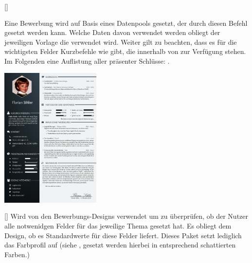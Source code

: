[]
\def\txewidth{0cm}
\begin{example}
    \gdef\txewidth{5.5cm}
\end{example}
\begin{minipage}{\linewidth-\txewidth}
    Eine Bewerbung wird auf Basis eines Datenpools gesetzt, der durch diesen Befehl gesetzt werden kann. Welche Daten davon verwendet werden obliegt der jeweiligen Vorlage die verwendet wird. Weiter gilt zu beachten, dass es für die wichtigsten Felder Kurzbefehle wie  gibt, die innerhalb von  zur Verfügung stehen. Im Folgenden eine Auflistung aller präsenter Schlüsse: .
\end{minipage}\hfill
\begin{example}
    \begin{minipage}{5cm}
        \includegraphics[width=5cm]{Data/Bilder/Application.png}
    \end{minipage}
\end{example}

%
%
%

[]
Wird von den Bewerbungs-Designs verwendet um zu überprüfen, ob der Nutzer alle notwenidgen Felder für das jeweilige Thema gesetzt hat. Es obliegt dem Design, ob es Standardwerte für diese Felder liefert. Dieses Paket setzt lediglich das Farbprofil auf  (siehe , gesetzt werden hierbei  in entsprechend schattierten Farben.)

